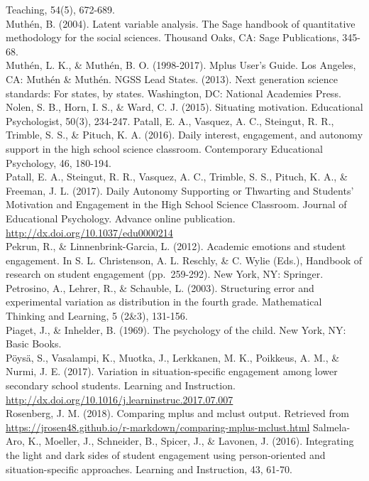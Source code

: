 \documentclass[]{msu-thesis}
\theoremstyle{definition}
\theoremstyle{definition}
\theoremstyle{definition}
\theoremstyle{remark}
\begin{document}
Teaching, 54(5), 672-689.\\
Muthén, B. (2004). Latent variable analysis. The Sage handbook of
quantitative methodology for the social sciences. Thousand Oaks, CA:
Sage Publications, 345-68.\\
Muthén, L. K., \& Muthén, B. O. (1998-2017). Mplus User's Guide. Los
Angeles, CA: Muthén \& Muthén. NGSS Lead States. (2013). Next generation
science standards: For states, by states. Washington, DC: National
Academies Press.\\
Nolen, S. B., Horn, I. S., \& Ward, C. J. (2015). Situating motivation.
Educational Psychologist, 50(3), 234-247. Patall, E. A., Vasquez, A. C.,
Steingut, R. R., Trimble, S. S., \& Pituch, K. A. (2016). Daily
interest, engagement, and autonomy support in the high school science
classroom. Contemporary Educational Psychology, 46, 180-194.\\
Patall, E. A., Steingut, R. R., Vasquez, A. C., Trimble, S. S., Pituch,
K. A., \& Freeman, J. L. (2017). Daily Autonomy Supporting or Thwarting
and Students' Motivation and Engagement in the High School Science
Classroom. Journal of Educational Psychology. Advance online
publication. \url{http://dx.doi.org/10.1037/edu0000214}\\
Pekrun, R., \& Linnenbrink-Garcia, L. (2012). Academic emotions and
student engagement. In S. L. Christenson, A. L. Reschly, \& C. Wylie
(Eds.), Handbook of research on student engagement (pp.~259-292). New
York, NY: Springer. Petrosino, A., Lehrer, R., \& Schauble, L. (2003).
Structuring error and experimental variation as distribution in the
fourth grade. Mathematical Thinking and Learning, 5 (2\&3), 131-156.\\
Piaget, J., \& Inhelder, B. (1969). The psychology of the child. New
York, NY: Basic Books.\\
Pöysä, S., Vasalampi, K., Muotka, J., Lerkkanen, M. K., Poikkeus, A. M.,
\& Nurmi, J. E. (2017). Variation in situation-specific engagement among
lower secondary school students. Learning and Instruction.
\url{http://dx.doi.org/10.1016/j.learninstruc.2017.07.007}\\
Rosenberg, J. M. (2018). Comparing mplus and mclust output. Retrieved
from
\url{https://jrosen48.github.io/r-markdown/comparing-mplus-mclust.html}
Salmela-Aro, K., Moeller, J., Schneider, B., Spicer, J., \& Lavonen, J.
(2016). Integrating the light and dark sides of student engagement using
person-oriented and situation-specific approaches. Learning and
Instruction, 43, 61-70.\\
\end{document}
